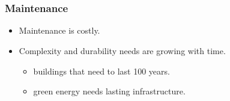 \section[Context and SoA]{\introtitle}

\begin{frame}
\frametitle{\textbf{Maintenance}}

  \begin{itemize}[<+->]
    \item Maintenance is costly.
    \item Complexity and durability needs are growing with time.
    \begin{itemize}[<+->]
      \item buildings that need to last 100 years.
      \item green energy needs lasting infrastructure.
    \end{itemize}
  \end{itemize}

\end{frame}

